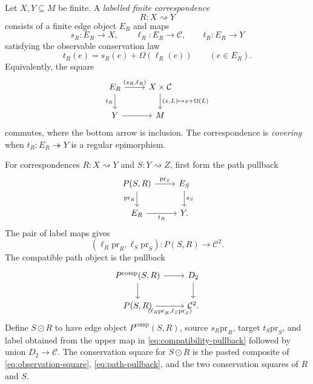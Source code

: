 Let $X,Y\subseteq M$ be finite.  A \emph{labelled finite correspondence}
\[
R:X\rightsquigarrow Y
\]
consists of a finite edge object $E_R$ and maps
\[
s_R:E_R\to X,
\qquad
\ell_R:E_R\to\mathcal C,
\qquad
t_R:E_R\to Y
\]
satisfying the observable conservation law
\begin{equation}\label{eq:edge-conservation}
t_R(e)=s_R(e)+\Omega(\ell_R(e))
\qquad(e\in E_R).
\end{equation}
Equivalently, the square
\begin{equation}\label{eq:edge-conservation-square}
\begin{tikzcd}
E_R \arrow[r,"{(s_R,\ell_R)}"] \arrow[d,"{t_R}"']
  & X\times\mathcal C \arrow[d,"{(x,L)\mapsto x+\Omega(L)}"]\\
Y \arrow[r] & M
\end{tikzcd}
\end{equation}
commutes, where the bottom arrow is inclusion.  The correspondence is \emph{covering} when $t_R:E_R\twoheadrightarrow Y$ is a regular epimorphism.

For correspondences $R:X\rightsquigarrow Y$ and $S:Y\rightsquigarrow Z$, first form the path pullback
\begin{equation}\label{eq:path-pullback}
\begin{tikzcd}
P(S,R) \arrow[r,"{\mathrm{pr}_S}"] \arrow[d,"{\mathrm{pr}_R}"']
  & E_S \arrow[d,"{s_S}"]\\
E_R \arrow[r,"{t_R}"'] & Y.
\end{tikzcd}
\end{equation}
The pair of label maps gives
\[
(\ell_R\mathrm{pr}_R,\ell_S\mathrm{pr}_S):P(S,R)\longrightarrow\mathcal C^2.
\]
The compatible path object is the pullback
\begin{equation}\label{eq:compatibility-pullback}
\begin{tikzcd}
P^{\mathrm{comp}}(S,R) \arrow[r] \arrow[d]
  & D_2 \arrow[d]\\
P(S,R) \arrow[r,"{(\ell_R\mathrm{pr}_R,\ell_S\mathrm{pr}_S)}"']
  & \mathcal C^2.
\end{tikzcd}
\end{equation}
Define $S\odot R$ to have edge object $P^{\mathrm{comp}}(S,R)$, source $s_R\mathrm{pr}_R$, target $t_S\mathrm{pr}_S$, and label obtained from the upper map in \eqref{eq:compatibility-pullback} followed by union $D_2\to\mathcal C$.  The conservation square for $S\odot R$ is the pasted composite of \eqref{eq:observation-square}, \eqref{eq:path-pullback}, and the two conservation squares of $R$ and $S$.

